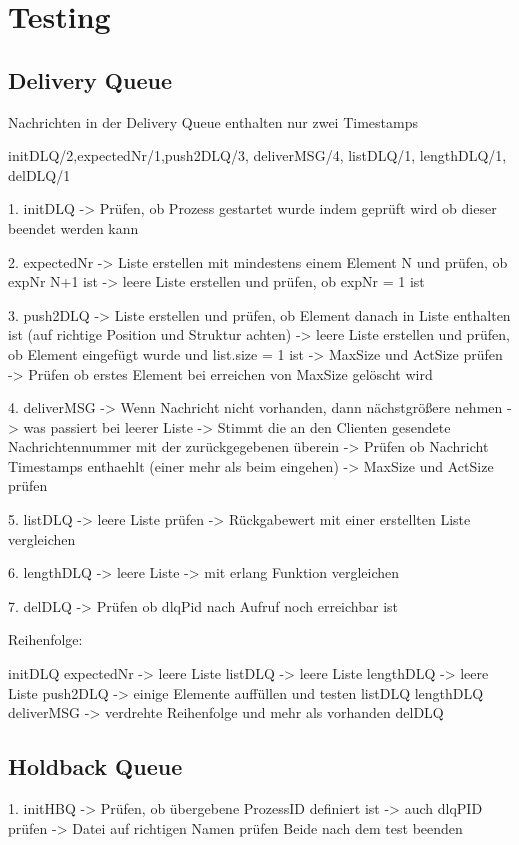 \section{Testing}

\subsection{Delivery Queue}

Nachrichten in der Delivery Queue enthalten nur zwei Timestamps 

initDLQ/2,expectedNr/1,push2DLQ/3, deliverMSG/4, listDLQ/1, lengthDLQ/1, delDLQ/1

1. initDLQ
-> Prüfen, ob Prozess gestartet wurde indem geprüft wird ob dieser beendet werden kann

2. expectedNr
-> Liste erstellen mit mindestens einem Element N und prüfen, ob expNr N+1 ist
-> leere Liste erstellen und prüfen, ob expNr = 1 ist

3. push2DLQ
-> Liste erstellen und prüfen, ob Element danach in Liste enthalten ist (auf richtige Position und Struktur achten)
-> leere Liste erstellen und prüfen, ob Element eingefügt wurde und list.size = 1 ist 
-> MaxSize und ActSize prüfen
-> Prüfen ob erstes Element bei erreichen von MaxSize gelöscht wird 

4. deliverMSG
-> Wenn Nachricht nicht vorhanden, dann nächstgrößere nehmen
-> was passiert bei leerer Liste 
-> Stimmt die an den Clienten gesendete Nachrichtennummer mit der zurückgegebenen überein
-> Prüfen ob Nachricht Timestamps enthaehlt (einer mehr als beim eingehen)
-> MaxSize und ActSize prüfen

5. listDLQ
-> leere Liste prüfen 
-> Rückgabewert mit einer erstellten Liste vergleichen 

6. lengthDLQ
-> leere Liste 
-> mit erlang Funktion vergleichen 

7. delDLQ
-> Prüfen ob dlqPid nach Aufruf noch erreichbar ist 

Reihenfolge:

initDLQ
expectedNr -> leere Liste 
listDLQ -> leere Liste
lengthDLQ -> leere Liste
push2DLQ -> einige Elemente auffüllen und testen 
listDLQ 
lengthDLQ
deliverMSG -> verdrehte Reihenfolge und mehr als vorhanden
delDLQ

\subsection{Holdback Queue}

1. initHBQ
-> Prüfen, ob übergebene ProzessID definiert ist 
-> auch dlqPID prüfen
-> Datei auf richtigen Namen prüfen
Beide nach dem test beenden 

